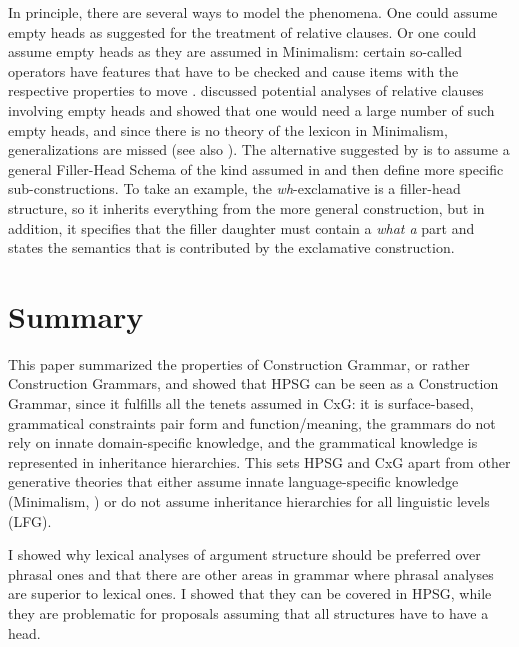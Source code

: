 \documentclass[output=paper,biblatex,babelshorthands,newtxmath,draftmode,colorlinks,citecolor=brown]{langscibook}
\begin{document}
In principle, there are several ways to model the phenomena. One could assume empty
heads as \citet[Chapter~5]{ps2} suggested for the treatment of relative clauses. Or one could assume empty
heads as they are assumed in Minimalism: certain so-called operators have features that have to be
checked and cause items with the respective properties to move \citep[--331]{Adger2003a}. \citet{Borsley2006a} discussed potential
analyses of relative clauses involving empty heads and showed that one would need a large number of
such empty heads, and since there is no theory of the lexicon in Minimalism, generalizations are
missed (see also ). The alternative suggested by
\citet{Sag2010b} is to assume a general Filler-Head Schema of the kind assumed in  and
then define more specific sub-constructions. To take an example, the \emph{wh}-exclamative is a filler-head
structure, so it inherits everything from the more general construction, but in addition, it
specifies that the filler daughter must contain a \emph{what a} part and states the semantics that is
contributed by the exclamative construction.


\section{Summary}
\label{sec-summary}

This paper summarized the properties of Construction Grammar, or rather Construction Grammars, and
showed that HPSG can be seen as a Construction Grammar, since it fulfills all the tenets assumed in
CxG: it is surface-based, grammatical constraints pair form and function/meaning, the grammars do
not rely on innate domain-specific knowledge, and the grammatical knowledge is represented in
inheritance hierarchies. This sets HPSG and CxG apart from other generative theories that either
assume innate language-specific knowledge (Minimalism, \eg
\citealt{Chomsky2013a,Kayne94a-u,CR2010a}) or do not assume inheritance hierarchies for all linguistic levels (\eg LFG).

I showed why lexical analyses of argument structure should be
preferred over phrasal ones and that there are other areas in grammar where phrasal analyses are
superior to lexical ones. I showed that they can be covered in HPSG, while they are problematic for
proposals assuming that all structures have to have a head.
\indexcxgend

\end{document}
